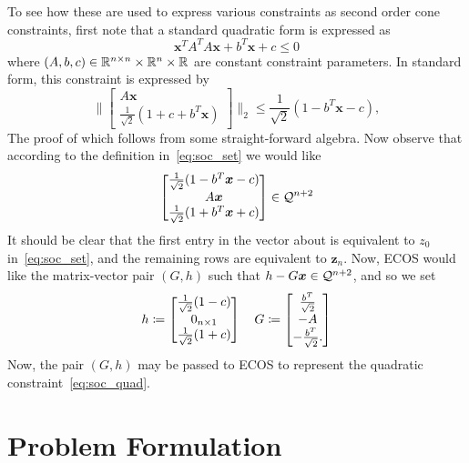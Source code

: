 \documentclass[12pt]{article}
\begin{document}
To see how these are used to express various constraints as second order cone constraints, first note that a standard quadratic form is expressed as
\begin{equation}
\bm{x}^T A ^T A \bm{x} + b^T \bm{x} + c \leq 0
\label{eq:soc_quad}
\end{equation}
where $(A,b,c) \in {\mathbb{R}}^{n\times n} \times {\mathbb{R}}^n \times {\mathbb{R}}$ are constant constraint parameters. In standard form, this constraint is expressed by
\begin{equation}
\biggr\| \begin{bmatrix}
A \bm{x} \\ \frac{1}{\sqrt{2}}( 1 + c + b^T \bm{x} )
\end{bmatrix} \biggr\|_2 \leq \frac{1}{\sqrt{2}} ( 1 - b^T \bm{x} - c),
\label{eq:soc_std}
\end{equation} 
The proof of which follows from some straight-forward algebra. Now observe that according to the definition in~\eqref{eq:soc_set} we would like
\begin{equation*}
\begin{bmatrix}
\frac{1}{\sqrt{2}} ( 1 - b^T \bm{x} - c) \\
A \bm{x} \\
\frac{1}{\sqrt{2}} ( 1 + b^T \bm{x} + c)
\end{bmatrix} \in \mathcal{Q}^{n+2}
\end{equation*}
It should be clear that the first entry in the vector about is equivalent to $z_0$ in~\eqref{eq:soc_set}, and the remaining rows are equivalent to $\bm{z}_n$. Now, ECOS would like the matrix-vector pair $(G,h)$ such that $h-G\bm{x}\in\mathcal{Q}^{n+2}$, and so we set
\begin{equation}
h \coloneqq \begin{bmatrix}
\frac{1}{\sqrt{2}}( 1 - c ) \\ 0_{n \times 1} \\ \frac{1}{\sqrt{2}}(1+c)
\end{bmatrix} \quad G \coloneqq \begin{bmatrix}
\frac{b^T}{\sqrt{2}} \\ -A \\ -\frac{b^T}{\sqrt{2}}.
\end{bmatrix}
\end{equation}
Now, the pair $(G,h)$ may be passed to ECOS to represent the quadratic constraint~\eqref{eq:soc_quad}.



\section{Problem Formulation}
\end{document}
